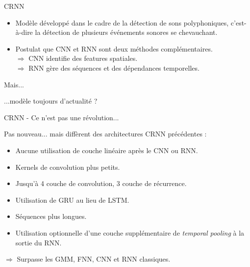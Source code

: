 \documentclass[compress,xcolor=table]{beamer}
\begin{document}
\begin{frame}{CRNN}

    \begin{block}{\cite{cakirConvolutionalRecurrentNeural2017a}}

        \begin{itemize}
            \item Modèle développé dans le cadre de la détection de sons polyphoniques, c'est-à-dire la détection de plusieurs événements sonores se chevauchant.
            \item Postulat que CNN et RNN sont deux méthodes complémentaires.\\
                  $\Rightarrow$ CNN identifie des features spatiales.\\
                  $\Rightarrow$ RNN gère des séquences et des dépendances temporelles.
        \end{itemize}

    \end{block}

    \begin{alertblock}{Mais...}

        ...modèle toujours d'actualité ?

    \end{alertblock}

\end{frame}

\begin{frame}{CRNN - Ce n'est pas une révolution...}

    Pas nouveau... mais diffèrent des architectures CRNN précédentes :

    \begin{exampleblock}{\cite{cakirConvolutionalRecurrentNeural2017a}}

        \begin{itemize}
            \item Aucune utilisation de couche linéaire après le CNN ou RNN.
            \item Kernels de convolution plus petits.
            \item Jusqu'à 4 couche de convolution, 3 couche de récurrence.
            \item Utilisation de GRU au lieu de LSTM.
            \item Séquences plus longues.
            \item Utilisation optionnelle d'une couche supplémentaire de \textit{temporal pooling} à la sortie du RNN.
        \end{itemize}

    \end{exampleblock}

    $\Rightarrow$ Surpasse les GMM, FNN, CNN et RNN classiques.

\end{frame}
\end{document}
